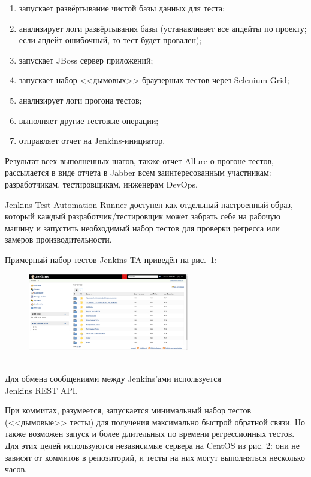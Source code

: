 \documentclass[10pt, a5paper]{article}
\begin{document}
\begin{enumerate}
  \item запускает развёртывание чистой базы данных для теста;
  \item анализирует логи развёртывания базы (устанавливает все апдейты по проекту; если апдейт ошибочный, то тест будет провален);
  \item запускает JBoss сервер приложений;
  \item запускает набор <<дымовых>> браузерных тестов через Selenium Grid;
  \item анализирует логи прогона тестов;
  \item выполняет другие тестовые операции;
  \item отправляет отчет на Jenkins-инициатор.
\end{enumerate}

Результат всех выполненных шагов, также отчет Allure о прогоне тестов, рассылается в виде отчета в Jabber всем заинтересованным участникам: разработчикам, тестировщикам, инженерам DevOps.

Jenkins Test Automation Runner доступен как отдельный настроенный образ, который каждый разработчик/тестировщик может забрать себе на рабочую машину и запустить необходимый набор тестов для проверки регресса или замеров производительности.

Примерный набор тестов Jenkins TA приведён на рис.~\ref{Gagarin5}:

\begin{center}
\begin{figure}[h!]
  \centering
  \includegraphics[width=7cm]{13_2018_Gagarin5}
  \caption{~}
  \label{Gagarin5}
\end{figure}
\end{center} 

Для обмена сообщениями между Jenkins'ами используется \\Jenkins REST API.

При коммитах, разумеется, запускается минимальный набор тестов (<<дымовые>> тесты) для получения максимально быстрой обратной связи. Но также возможен запуск и более длительных по времени регрессионных тестов. Для этих целей используются независимые сервера на CentOS из рис. 2: они не зависят от коммитов в репозиторий, и тесты на них могут выполняться несколько часов.
\end{document}
